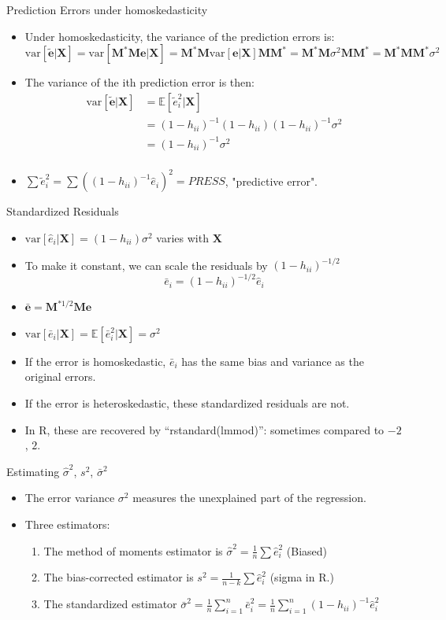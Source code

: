 \documentclass[aspectratio=169, handout]{beamer}
\numberwithin{equation}{section}
\newcommand{\var}{\text{var}}
\begin{document}
\begin{frame}{Prediction Errors under homoskedasticity}
\begin{itemize}
\item Under homoskedasticity, the variance of the prediction errors is:
 $$\var[\bm{\tilde{e}}|\bm{X}]=\var[\bm{M^*Me}|\bm{X}]=\bm{M^*M}\var[\bm{e}|\bm{X}]\bm{MM^*}=\bm{M^*M}\sigma^2\bm{MM^*}=\bm{M^*MM^*}\sigma^2$$
\item The variance of the ith prediction error is then:
 \begin{align*}
\var[\bm{\tilde{e}}|\bm{X}]&=\mathbb{E}[\tilde{e}_i^2|\bm{X}]\\
&=(1-h_{ii})^{-1}(1-h_{ii})(1-h_{ii})^{-1}\sigma^2\\
&=(1-h_{ii})^{-1}\sigma^2\\
\end{align*}
\item $\sum \tilde{e}_i^2=\sum ((1-h_{ii})^{-1}\hat{e}_i)^2=PRESS$, "predictive error".
\end{itemize}
\end{frame}

\begin{frame}{Standardized Residuals}
\begin{itemize}
\item $\var[\hat{e}_i|\bm{X}]=(1-h_{ii})\sigma^2$ varies with $\bm{X}$
\item To make it constant, we can scale the residuals by $(1-h_{ii})^{-1/2}$
$$\bar{e}_i=(1-h_{ii})^{-1/2}\hat{e}_i$$
\item $\bm{\bar{e}}=\bm{M}^{*1/2}\bm{Me}$
\item $\var[\bar{e}_i|\bm{X}]=\mathbb{E}[\bar{e}_i^2|\bm{X}]=\sigma^2$
\item If the error is homoskedastic, $\bar{e}_i$ has the same bias and variance as the original errors.
\item If the error is heteroskedastic, these standardized residuals are not.
\item In R, these are recovered by ``rstandard(lmmod)'': sometimes compared to $-2$, $2$.
\end{itemize}
\end{frame}  



\begin{frame}{Estimating $\hat{\sigma}^2$, $s^2$, $\bar{\sigma}^2$}
\begin{itemize}
\item The error variance $\sigma^2$ measures the unexplained part of the regression.
\item Three estimators:
\begin{enumerate}
\item The method of moments estimator is $\hat{\sigma}^2=\frac{1}{n}\sum\hat{e}_i^2$ (Biased)
\item The bias-corrected estimator is $s^2=\frac{1}{n-k}\sum\hat{e}_i^2$ (sigma in R.)
\item The standardized estimator $\bar{\sigma}^2=\frac{1}{n}\sum_{i=1}^n\bar{e}_i^2=\frac{1}{n}\sum_{i=1}^n(1-h_{ii})^{-1}\hat{e}_i^2$
\end{enumerate}
\end{itemize}
\end{frame}  
\end{document}
